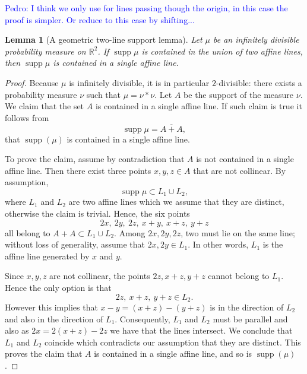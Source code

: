 \documentclass[11pt]{amsart}
\newtheorem{lemma}[theorem]{Lemma}
\newcommand{\R}{\mathbb R}
\newcommand{\supp}{\operatorname{supp}}
\begin{document}
\textcolor{blue}{Pedro: I think we only use for lines passing though the origin, in this case the proof is simpler. Or reduce to this case by shifting...}
\begin{lemma}[A geometric two-line support lemma]
\label{lem:two-line}
Let $\mu$ be an infinitely divisible probability measure on $\R^2$. If
$\supp \mu$ is contained in the union of two affine lines, then
$\supp \mu$ is contained in a single affine line.
\end{lemma}


\begin{proof}
Because $\mu$ is infinitely divisible, it is in particular $2$-divisible:
there exists a probability measure $\nu$ such that $\mu=\nu * \nu$. Let $A$ be the support of the measure $\nu$. We claim that the set $A$ is contained in a single affine line. If such claim is true it follows from
\[
\supp \mu = \overline{A+A},
\]
that $\supp(\mu)$ is contained in a single affine line.

To prove the claim, assume by contradiction that $A$ is not contained in a single affine line. Then there exist three points $x,y,z \in A$ that are not collinear. By assumption,
\[
\supp \mu \subset L_1 \cup L_2,
\]
where $L_1$ and $L_2$ are two affine lines which we assume that they are distinct, otherwise the claim is trivial.
Hence, the six points
\[
2x,\ 2y,\ 2z,\ x+y,\ x+z,\ y+z
\]
all belong to $A+A\subset L_1 \cup L_2$. Among $2x,2y,2z$, two must lie on the same line; without loss of generality, assume that $2x,2y \in L_1$. In other words, $L_1$ is the affine line generated by $x$ and $y$.

Since $x,y,z$ are not collinear, the points $2z, x+z, y+z$ cannot belong to $L_1$. Hence the only option is that
\[
2z,\ x+z,\ y+z \in L_2.
\]
However this implies that $x-y=(x+z)-(y+z)$ is in the direction of $L_2$ and  also in the direction of $L_1$. Consequently, $L_1$ and $L_2$ must be parallel and also as $2x=2(x+z)-2z$ we have that the lines intersect. We conclude that $L_1$ and $L_2$ coincide which contradicts our assumption that they are distinct. This proves the claim that $A$ is contained in a single affine line, and so is $\supp(\mu)$.



\end{proof}
\end{document}
